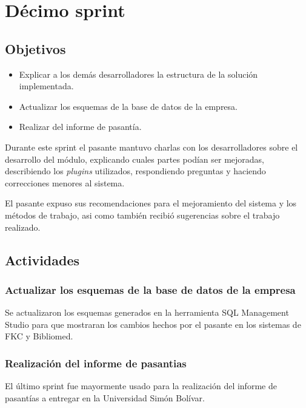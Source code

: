\section{Décimo sprint} %
\label{sec:decimo_sprint}

\subsection{Objetivos}

\begin{itemize}
	\item Explicar a los demás desarrolladores la estructura de la solución implementada.
	\item Actualizar los esquemas de la base de datos de la empresa.
	\item Realizar del informe de pasantía.
\end{itemize}

Durante este sprint el pasante mantuvo charlas con los desarrolladores sobre el desarrollo del módulo, explicando cuales partes podían ser mejoradas, describiendo los \emph{plugins} utilizados, respondiendo preguntas y haciendo correcciones menores al sistema. 

El pasante expuso sus recomendaciones para el mejoramiento del sistema y los métodos de trabajo, asi como también recibió sugerencias sobre el trabajo realizado.

\subsection{Actividades} %
\label{sub:actividades6}

\subsubsection{Actualizar los esquemas de la base de datos de la empresa}

Se actualizaron los esquemas generados en la herramienta SQL Management Studio para que mostraran los cambios hechos por el pasante en los sistemas de FKC y Bibliomed.

\subsubsection{Realización del informe de pasantias}

El último sprint fue mayormente usado para la realización del informe de pasantías a entregar en la Universidad Simón Bolívar.

